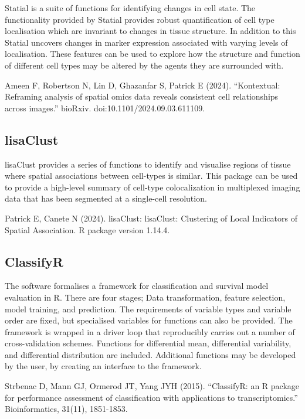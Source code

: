\documentclass[
  letterpaper,
  DIV=11,
  numbers=noendperiod]{scrreprt}
\begin{document}
Statial is a suite of functions for identifying changes in cell state.
The functionality provided by Statial provides robust quantification of
cell type localisation which are invariant to changes in tissue
structure. In addition to this Statial uncovers changes in marker
expression associated with varying levels of localisation. These
features can be used to explore how the structure and function of
different cell types may be altered by the agents they are surrounded
with.

Ameen F, Robertson N, Lin D, Ghazanfar S, Patrick E (2024).
``Kontextual: Reframing analysis of spatial omics data reveals
consistent cell relationships across images.'' bioRxiv.
doi:10.1101/2024.09.03.611109.

\subsection*{lisaClust}\label{lisaclust}

lisaClust provides a series of functions to identify and visualise
regions of tissue where spatial associations between cell-types is
similar. This package can be used to provide a high-level summary of
cell-type colocalization in multiplexed imaging data that has been
segmented at a single-cell resolution.

Patrick E, Canete N (2024). lisaClust: lisaClust: Clustering of Local
Indicators of Spatial Association. R package version 1.14.4.

\subsection*{ClassifyR}\label{classifyr}

The software formalises a framework for classification and survival
model evaluation in R. There are four stages; Data transformation,
feature selection, model training, and prediction. The requirements of
variable types and variable order are fixed, but specialised variables
for functions can also be provided. The framework is wrapped in a driver
loop that reproducibly carries out a number of cross-validation schemes.
Functions for differential mean, differential variability, and
differential distribution are included. Additional functions may be
developed by the user, by creating an interface to the framework.

Strbenac D, Mann GJ, Ormerod JT, Yang JYH (2015). ``ClassifyR: an R
package for performance assessment of classification with applications
to transcriptomics.'' Bioinformatics, 31(11), 1851-1853.
\end{document}
